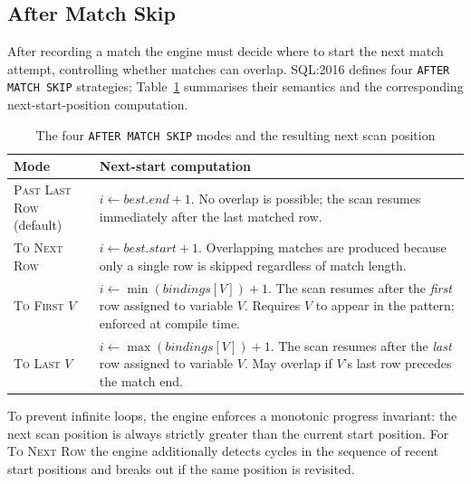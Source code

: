 \subsection{After Match Skip}
\label{subsec:meth-exec-skip}

After recording a match the engine must decide where to start the
next match attempt, controlling whether matches can overlap.
SQL:2016 defines four \texttt{AFTER MATCH SKIP} strategies;
Table~\ref{tab:skip-modes} summarises their semantics and the
corresponding next-start-position computation.

\begin{table}[htbp]
  \centering
  \caption{The four \texttt{AFTER MATCH SKIP} modes and the
    resulting next scan position}
  \label{tab:skip-modes}
  \begin{tabular}{lp{9cm}}
    \toprule
    \textbf{Mode} & \textbf{Next-start computation} \\
    \midrule
    \textsc{Past Last Row} (default) &
      $i \leftarrow \mathit{best.end} + 1$. No overlap is possible;
      the scan resumes immediately after the last matched row. \\[4pt]
    \textsc{To Next Row} &
      $i \leftarrow \mathit{best.start} + 1$. Overlapping matches
      are produced because only a single row is skipped regardless
      of match length. \\[4pt]
    \textsc{To First} $V$ &
      $i \leftarrow \min(\mathit{bindings}[V]) + 1$. The scan
      resumes after the \emph{first} row assigned to variable $V$.
      Requires $V$ to appear in the pattern; enforced at compile time. \\[4pt]
    \textsc{To Last} $V$ &
      $i \leftarrow \max(\mathit{bindings}[V]) + 1$. The scan
      resumes after the \emph{last} row assigned to variable $V$.
      May overlap if $V$'s last row precedes the match end. \\
    \bottomrule
  \end{tabular}
\end{table}

\noindent
To prevent infinite loops, the engine enforces a monotonic
progress invariant: the next scan position is always strictly
greater than the current start position.  For
\textsc{To Next Row} the engine additionally detects cycles in
the sequence of recent start positions and breaks out if the same
position is revisited.

